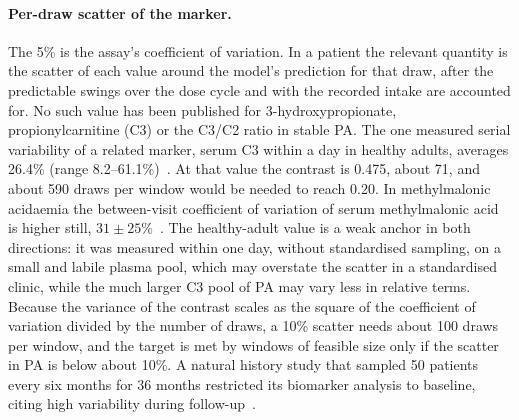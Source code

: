 \paragraph{Per-draw scatter of the marker.} The 5\% is the assay's coefficient of variation. In
a patient the relevant quantity is the scatter of each value around the model's prediction for
that draw, after the predictable swings over the dose cycle and with the recorded intake are
accounted for. No such value has been published for 3-hydroxypropionate, propionylcarnitine (C3)
or the C3/C2 ratio in stable PA. The one measured serial variability of a related marker, serum
C3 within a day in healthy adults, averages 26.4\% (range 8.2--61.1\%)~\cite{thompson2012c3}. At
that value the contrast is 0.475, about 71\um, and about 590 draws per window would be needed to
reach 0.20. In methylmalonic acidaemia the between-visit coefficient of variation of serum
methylmalonic acid is higher still, $31\pm25\%$~\cite{breath_test_mma}. The healthy-adult value is
a weak anchor in both directions: it was measured within one day, without standardised sampling,
on a small and labile plasma pool, which may overstate the scatter in a standardised clinic, while
the much larger C3 pool of PA may vary less in relative terms. Because the variance of the
contrast scales as the square of the coefficient of variation divided by the number of draws, a
10\% scatter needs about 100 draws per window, and the target is met by windows of feasible size
only if the scatter in PA is below about 10\%. A natural history study that sampled 50 patients
every six months for 36 months restricted its biomarker analysis to baseline, citing high
variability during follow-up~\cite{natural_history}.

